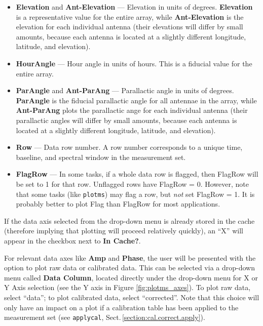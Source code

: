 \begin{itemize}
\item {\bf Elevation} and {\bf Ant-Elevation} --- Elevation in units
  of degrees. {\bf Elevation} is a representative value for the entire
  array, while {\bf Ant-Elevation} is the elevation for each
  individual antenna (their elevations will differ by small amounts,
  because each antenna is located at a slightly different longitude,
  latitude, and elevation).

\item {\bf HourAngle} --- Hour angle in units of hours. This is a fiducial value for the entire array.

\item {\bf ParAngle} and {\bf Ant-ParAng} --- Parallactic angle in
  units of degrees. {\bf ParAngle} is the fiducial parallactic angle
  for all antennae in the array, while {\bf Ant-ParAng} plots the
  parallactic ange for each individual antenna (their parallactic
  angles will differ by small amounts, because each antenna is located
  at a slightly different longitude, latitude, and elevation).

\item {\bf Row} --- Data row number. A row number corresponds to a
  unique time, baseline, and spectral window in the measurement set.

\item {\bf FlagRow} --- In some tasks, if a whole data row is flagged,
  then FlagRow will be set to 1 for that row. Unflagged rows have
  FlagRow = 0. However, note that some tasks (like {\tt plotms}) may
  flag a row, but {\it not} set FlagRow = 1. It is probably better to
  plot Flag than FlagRow for most applications.
\end{itemize}

If the data axis selected from the drop-down menu is already stored in
the cache (therefore implying that plotting will proceed relatively
quickly), an ``X'' will appear in the checkbox next to {\bf In
  Cache?}.

For relevant data axes like {\bf Amp} and {\bf Phase}, the user will
be presented with the option to plot raw data or calibrated data. This
can be selected via a drop-down menu called {\bf Data Column}, located
directly under the drop-down menu for X or Y Axis selection (see the Y
axis in Figure \ref{fig:plotms_axes}). To plot raw data, select
``data''; to plot calibrated data, select ``corrected''. Note that
this choice will only have an impact on a plot if a calibration table
has been applied to the measurement set (see {\tt applycal},
Sect.\,\ref{section:cal.correct.apply}).

